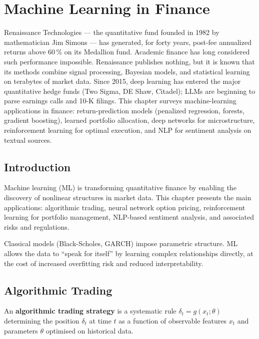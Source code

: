 \chapter{Machine Learning in Finance}
\label{ch:ml_finance}

Renaissance Technologies --- the quantitative fund founded in 1982 by mathematician Jim Simons --- has generated, for forty years, post-fee annualized returns above 60\,\% on its Medallion fund. Academic finance has long considered such performance impossible. Renaissance publishes nothing, but it is known that its methods combine signal processing, Bayesian models, and statistical learning on terabytes of market data. Since 2015, deep learning has entered the major quantitative hedge funds (Two Sigma, DE Shaw, Citadel); LLMs are beginning to parse earnings calls and 10-K filings. This chapter surveys machine-learning applications in finance: return-prediction models (penalized regression, forests, gradient boosting), learned portfolio allocation, deep networks for microstructure, reinforcement learning for optimal execution, and NLP for sentiment analysis on textual sources.

\section{Introduction}

Machine learning (ML) is transforming
quantitative finance by enabling the discovery of nonlinear structures in
market data. This chapter presents the main applications: algorithmic trading,
neural network option pricing, reinforcement learning for portfolio management,
NLP-based sentiment analysis, and associated risks and regulations.

\begin{intuition}
Classical models (Black-Scholes, GARCH) impose parametric structure. ML allows
the data to ``speak for itself'' by learning complex relationships directly,
at the cost of increased overfitting risk and reduced interpretability.
\end{intuition}

\section{Algorithmic Trading}

\begin{definition}
An \textbf{algorithmic trading strategy} is a systematic rule
$\delta_t = g(x_t; \theta)$ determining the position $\delta_t$ at time $t$
as a function of observable features $x_t$ and parameters $\theta$ optimised
on historical data.
\end{definition}

